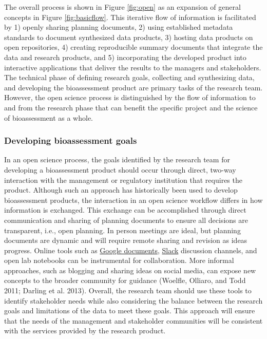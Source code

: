 \documentclass[fleqn,10pt,lineno]{wlpeerj} %
\begin{document}
The overall process is shown in Figure \ref{fig:open} as an expansion of general concepts in Figure \ref{fig:basicflow}. This iterative flow of information is facilitated by 1) openly sharing planning documents, 2) using established metadata standards to document synthesized data products, 3) hosting data products on open repositories, 4) creating reproducible summary documents that integrate the data and research products, and 5) incorporating the developed product into interactive applications that deliver the results to the managers and stakeholders. The technical phase of defining research goals, collecting and synthesizing data, and developing the bioassessment product are primary tasks of the research team. However, the open science process is distinguished by the flow of information to and from the research phase that can benefit the specific project and the science of bioassessment as a whole.

\hypertarget{developing-bioassessment-goals}{%
\subsubsection{Developing bioassessment goals}\label{developing-bioassessment-goals}}

In an open science process, the goals identified by the research team for developing a bioassessment product should occur through direct, two-way interaction with the management or regulatory institution that requires the product. Although such an approach has historically been used to develop bioassessment products, the interaction in an open science workflow differs in how information is exchanged. This exchange can be accomplished through direct communication and sharing of planning documents to ensure all decisions are transparent, i.e., open planning. In person meetings are ideal, but planning documents are dynamic and will require remote sharing and revision as ideas progress. Online tools such as \href{https://www.google.com/docs/about/}{Google documents}, \href{https://slack.com/}{Slack} discussion channels, and open lab notebooks can be instrumental for collaboration. More informal approaches, such as blogging and sharing ideas on social media, can expose new concepts to the broader community for guidance (Woelfle, Olliaro, and Todd 2011; Darling et al. 2013). Overall, the research team should use these tools to identify stakeholder needs while also considering the balance between the research goals and limitations of the data to meet these goals. This approach will ensure that the needs of the management and stakeholder communities will be consistent with the services provided by the research product.
\end{document}
